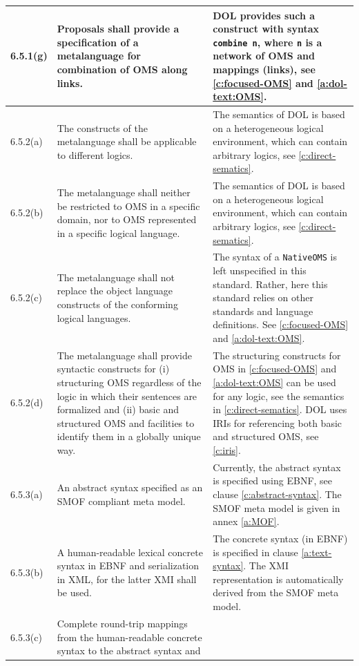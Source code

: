 \documentclass[10pt,fleqn,%
\ifpretendfinal
final%
\else
draft%
\fi,
]{scrreprt}
\newcommand*{\syntax}[1]{\texttt{#1}}
\begin{document}
\begin{center}
\begin{longtable}{|p{}|p{}|p{}|}
	\\ \hline
%
6.5.1(g) & 
Proposals shall provide a specification of a metalanguage for combination of OMS along links. 	&
DOL provides such a construct with syntax \syntax{combine n}, where \syntax{n} is a network of OMS and mappings (links),  see \ref{c:focused-OMS} and \ref{a:dol-text:OMS}.
	\\ \hline
%
6.5.2(a)& 
The constructs of the metalanguage shall be applicable to different logics.	&
The semantics of DOL is based on a heterogeneous logical
environment, which can contain arbitrary logics, see \ref{c:direct-sematics}.
   \\ \hline
%
6.5.2(b)& 
The metalanguage shall neither be restricted to OMS in a specific domain, nor to OMS represented
in a specific logical language.	&
The semantics of DOL is based on a heterogeneous logical
environment, which can contain arbitrary logics, see \ref{c:direct-sematics}.
   \\ \hline
%
6.5.2(c)& 
The metalanguage shall not replace the object language constructs of the conforming logical
languages.	&
The syntax of a \syntax{NativeOMS} is left unspecified in this standard. Rather, here this standard relies on other
standards and language definitions.
See \ref{c:focused-OMS} and \ref{a:dol-text:OMS}.
   \\ \hline
%
6.5.2(d)& 
The metalanguage shall provide syntactic constructs for (i) structuring OMS regardless of the
logic in which their sentences are formalized and (ii) basic and structured OMS and facilities to
identify them in a globally unique way.
	&
The structuring constructs for OMS in \ref{c:focused-OMS} and \ref{a:dol-text:OMS} can be used for 
any logic, see the semantics in \ref{c:direct-sematics}. DOL uses IRIs for referencing both basic and structured OMS, see
\ref{c:iris}.
   \\ \hline
%
6.5.3(a)& 
An abstract syntax specified as an SMOF compliant meta model.	&
Currently, the abstract syntax is specified using EBNF, see clause \ref{c:abstract-syntax}. The
SMOF meta model is given in annex \ref{a:MOF}.
   \\ \hline
%
6.5.3(b)& 
A human-readable lexical concrete syntax in EBNF and serialization in XML, for the latter XMI shall
be used.	&
The concrete syntax (in EBNF) is specified in clause \ref{a:text-syntax}. The XMI representation 
is automatically derived from the SMOF meta model.
   \\ \hline
%
6.5.3(c)& 
Complete round-trip mappings from the human-readable concrete syntax to the abstract syntax and

\end{longtable}
\end{center}
\end{document}
